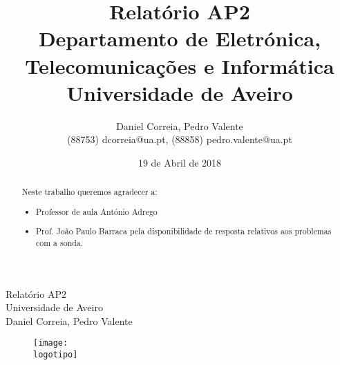 \documentclass{report}
\begin{document}
%
\def\titulo{Relatório AP2}
\def\data{19 de Abril de 2018}
\def\autores{Daniel Correia, Pedro Valente}
\def\autorescontactos{(88753) dcorreia@ua.pt, (88858) pedro.valente@ua.pt}
\def\departamento{Departamento de Eletrónica, Telecomunicações e Informática}
\def\empresa{Universidade de Aveiro}
\def\logotipo{ua.pdf}
%
%
\begin{titlepage}

\begin{center}
%
\vspace*{50mm}
%
{\Huge \titulo}\\ 
%
\vspace{10mm}
%
{\Large \empresa}\\
%
\vspace{10mm}
%
{\LARGE \autores}\\ 
%
\vspace{30mm}
%
\begin{figure}[h]
\center
\texttt{[image: \\logotipo]}
\end{figure}
%
\vspace{30mm}
\end{center}
%
\begin{flushright}

\end{flushright}
\end{titlepage}

\title{%
{\Huge\textbf{\titulo}}\\
{\Large \departamento\\ \empresa}
}
%
\author{%
    \autores \\
    \autorescontactos
}
%
\date{\data}
%
\maketitle


\renewcommand{\abstractname}{Agradecimentos}
\begin{abstract}
Neste trabalho queremos agradecer a: 
\begin{itemize}
\item Professor de aula António Adrego
\item Prof. João Paulo Barraca pela disponibilidade de resposta relativos aos problemas com a sonda.
\end{itemize}
\end{abstract}
\end{document}
